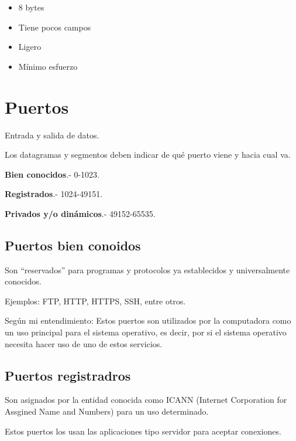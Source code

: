 \documentclass{article}
\begin{document}
\begin{itemize}
	\item
	8 bytes
	\item
	Tiene pocos campos
	\item
	Ligero
	\item
	Mínimo esfuerzo
\end{itemize}
\vspace{1em}

\section{Puertos}

Entrada y salida de datos.
\vspace{1em}

Los datagramas y segmentos deben indicar de qué puerto viene y hacia cual va.
\vspace{1em}

\textbf{Bien conocidos}.- 0-1023.

\textbf{Registrados}.- 1024-49151.

\textbf{Privados y/o dinámicos}.- 49152-65535.
\vspace{1em}

\subsection{Puertos bien conoidos}

Son ``reservados'' para programas y protocolos ya establecidos y universalmente
conocidos.
\vspace{1em}

Ejemplos: FTP, HTTP, HTTPS, SSH, entre otros.
\vspace{1em}

Según mi entendimiento: Estos puertos son utilizados por la computadora como
un uso principal para el sistema operativo, es decir, por si el sistema operativo
necesita hacer uso de uno de estos servicios.

\subsection{Puertos registradros}

Son asignados por la entidad conocida como ICANN (Internet Corporation for
Assgined Name and Numbers) para un uso determinado.
\vspace{1em}

Estos puertos los usan las aplicaciones tipo servidor para aceptar conexiones.
\vspace{1em}
\end{document}
